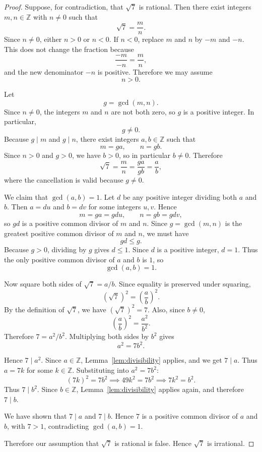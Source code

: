 \begin{proof}
  Suppose, for contradiction, that \(\sqrt{7}\) is rational. Then there exist
  integers \(m,n\in\mathbb{Z}\) with \(n\neq 0\) such that
  \[
    \sqrt{7} = \frac{m}{n}.
  \]
  Since \(n\neq 0\), either \(n>0\) or \(n<0\). If \(n<0\), replace \(m\) and
  \(n\) by \(-m\) and \(-n\). This does not change the fraction because
  \[
    \frac{-m}{-n} = \frac{m}{n},
  \]
  and the new denominator \(-n\) is positive. Therefore we may assume
  \[
    n>0.
  \]

  Let
  \[
    g = \gcd(m,n).
  \]
  Since \(n\neq 0\), the integers \(m\) and \(n\) are not both zero, so
  \(g\) is a positive integer. In particular,
  \[
    g \neq 0.
  \]
  Because \(g\mid m\) and \(g\mid n\), there exist integers \(a,b\in\mathbb{Z}\)
  such that
  \[
    m=ga, \qquad n=gb.
  \]
  Since \(n>0\) and \(g>0\), we have \(b>0\), so in particular \(b\neq 0\).
  Therefore
  \[
    \sqrt{7}
    = \frac{m}{n}
    = \frac{ga}{gb}
    = \frac{a}{b},
  \]
  where the cancellation is valid because \(g\neq 0\).

  We claim that \(\gcd(a,b)=1\). Let \(d\) be any positive integer dividing both
  \(a\) and \(b\). Then \(a=du\) and \(b=dv\) for some integers \(u,v\). Hence
  \[
    m=ga=gdu, \qquad n=gb=gdv,
  \]
  so \(gd\) is a positive common divisor of \(m\) and \(n\). Since
  \(g=\gcd(m,n)\) is the greatest positive common divisor of \(m\) and \(n\),
  we must have
  \[
    gd \leq g.
  \]
  Because \(g>0\), dividing by \(g\) gives \(d\leq 1\). Since \(d\) is a positive
  integer, \(d=1\). Thus the only positive common divisor of \(a\) and \(b\) is
  \(1\), so
  \[
    \gcd(a,b)=1.
  \]

  Now square both sides of \(\sqrt{7} = a/b\).
  Since equality is preserved under squaring,
  \[
    (\sqrt{7})^2 = \left(\frac{a}{b}\right)^2.
  \]
  By the definition of \(\sqrt{7}\), we have \((\sqrt{7})^2 = 7\).
  Also, since \(b\neq 0\),
  \[
    \left(\frac{a}{b}\right)^2 = \frac{a^2}{b^2}.
  \]
  Therefore \(7 = a^2/b^2\). Multiplying both sides by \(b^2\) gives
  \[
    a^2 = 7b^2.
  \]

  Hence \(7 \mid a^2\). Since \(a\in\mathbb{Z}\), Lemma~\ref{lem:divisibility}
  applies, and we get \(7 \mid a\).
  Thus \(a=7k\) for some \(k\in\mathbb{Z}\). Substituting into \(a^2=7b^2\):
  \[
    (7k)^2 = 7b^2 \implies 49k^2 = 7b^2 \implies 7k^2 = b^2.
  \]
  Thus \(7 \mid b^2\). Since \(b\in\mathbb{Z}\), Lemma~\ref{lem:divisibility}
  applies again, and therefore \(7 \mid b\).

  We have shown that \(7\mid a\) and \(7\mid b\). Hence \(7\) is a positive
  common divisor of \(a\) and \(b\), with \(7>1\), contradicting
  \(\gcd(a,b)=1\).

  Therefore our assumption that \(\sqrt{7}\) is rational is false. Hence
  \(\sqrt{7}\) is irrational.
\end{proof}
